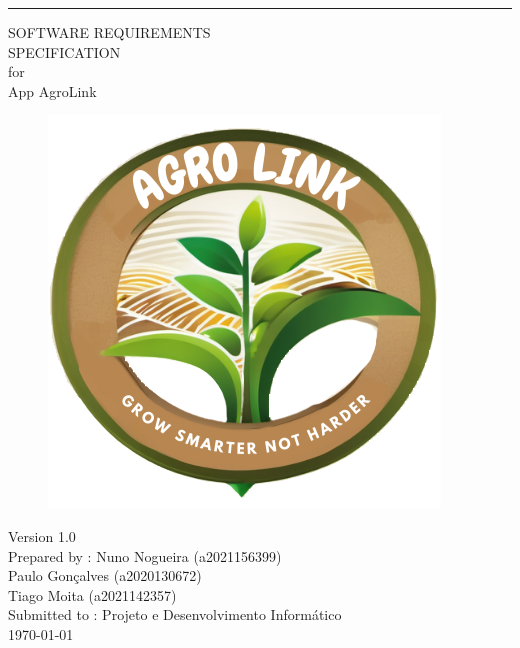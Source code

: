 \documentclass{scrreprt}
\date{}
\def\myversion{1.0 }
\begin{document}
	
	\begin{flushright}
		\rule{16cm}{5pt}\vskip1cm
		\begin{bfseries}
			\Huge{SOFTWARE REQUIREMENTS\\ SPECIFICATION}\\
			\vspace{0.8cm}
			for\\
			\vspace{0.8cm}
			App AgroLink\\
			
		\begin{figure}[h]
			\begin{minipage}{0.6\textwidth}
			\end{minipage}
			\hfill
			\begin{minipage}{0.3\textwidth}
				\centering
				\includegraphics[width=\textwidth]{AGROLINK.png}
		
			\end{minipage}
		\end{figure}

			\LARGE{Version \myversion}\\
			\vspace{1cm}
			Prepared by : Nuno Nogueira (a2021156399)\\
			Paulo Gonçalves (a2020130672)\\
			Tiago Moita (a2021142357)\\
			\vspace{0.8cm}
			Submitted to : Projeto e Desenvolvimento Informático\\
			\vspace{0.8cm}
			\today\\
		\end{bfseries}
	\end{flushright}
	
\end{document}
